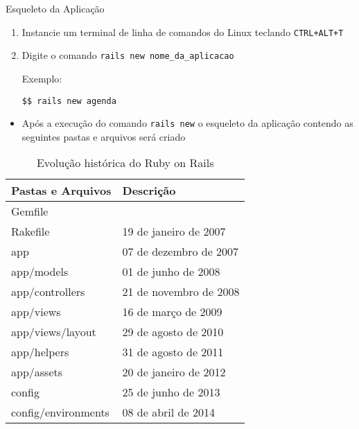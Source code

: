 \begin{frame}{Esqueleto da Aplicação}
  \begin{enumerate}
    \item Instancie um terminal de linha de comandos do Linux teclando \verb!CTRL+ALT+T! 
    \item Digite o comando \verb!rails new nome_da_aplicacao!
    \begin{exampleblock}{Exemplo:}
      \begin{lstlisting}[style=BashInputStyle]
	    $$ rails new agenda
      \end{lstlisting}
    \end{exampleblock}
  \end{enumerate}  
  
  \begin{itemize}
    \item Após a execução do comando \verb!rails new! o esqueleto
      da aplicação contendo as seguintes pastas e arquivos será criado
  \end{itemize}

  \begin{table}\centering\scriptsize
    \begin{tabular}{@{}ll@{}}\toprule
	  \textbf{Pastas e Arquivos} & \textbf{Descrição}	\\ \midrule
	  Gemfile & 	\\
	  Rakefile & 19 de janeiro de 2007	\\
	  app & 07 de dezembro de 2007	\\
	  app/models & 01 de junho de 2008	\\
	  app/controllers & 21 de novembro de 2008	\\ 
	  app/views & 16 de março de 2009	\\
	  app/views/layout & 29 de agosto de 2010	\\
	  app/helpers & 31 de agosto de 2011	\\
	  app/assets & 20 de janeiro de 2012	\\
	  config & 25 de junho de 2013	\\
	  config/environments & 08 de abril de 2014	\\ \bottomrule
    \end{tabular}
      \caption{Evolução histórica do Ruby on Rails}
    \end{table} 

\end{frame}
